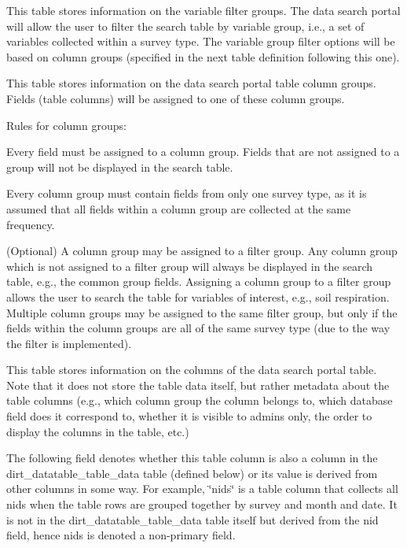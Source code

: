 This table stores information on the variable filter groups. The data search portal will allow the user to filter the search table by variable group, i.\+e., a set of variables collected within a survey type. The variable group filter options will be based on column groups (specified in the next table definition following this one).

This table stores information on the data search portal table column groups. Fields (table columns) will be assigned to one of these column groups.

Rules for column groups\+:
\begin{DoxyEnumerate}
\item Every field must be assigned to a column group. Fields that are not assigned to a group will not be displayed in the search table.
\item Every column group must contain fields from only one survey type, as it is assumed that all fields within a column group are collected at the same frequency.
\item (Optional) A column group may be assigned to a filter group. Any column group which is not assigned to a filter group will always be displayed in the search table, e.\+g., the common group fields. Assigning a column group to a filter group allows the user to search the table for variables of interest, e.\+g., soil respiration. Multiple column groups may be assigned to the same filter group, but only if the fields within the column groups are all of the same survey type (due to the way the filter is implemented).
\end{DoxyEnumerate}

This table stores information on the columns of the data search portal table. Note that it does not store the table data itself, but rather metadata about the table columns (e.\+g., which column group the column belongs to, which database field does it correspond to, whether it is visible to admins only, the order to display the columns in the table, etc.)

The following field denotes whether this table column is also a column in the dirt\+\_\+datatable\+\_\+table\+\_\+data table (defined below) or its value is derived from other columns in some way. For example, \char`\"{}nids\char`\"{} is a table column that collects all nids when the table rows are grouped together by survey and month and date. It is not in the dirt\+\_\+datatable\+\_\+table\+\_\+data table itself but derived from the nid field, hence nids is denoted a non-\/primary field.

